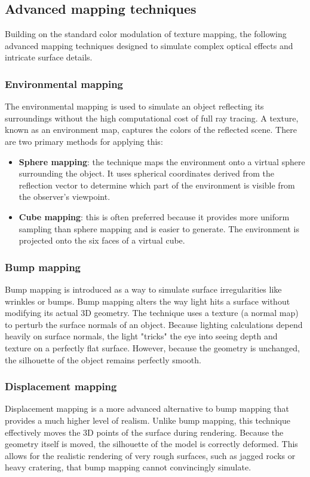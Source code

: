 \subsection{Advanced mapping techniques}
Building on the standard color modulation of texture mapping, the following advanced mapping techniques designed to simulate complex optical effects and intricate surface details. 

\subsubsection{Environmental mapping}
The environmental mapping is used to simulate an object reflecting its surroundings without the high computational cost of full ray tracing. A texture, known as an environment map, captures the colors of the reflected scene. There are two primary methods for applying this:
\begin{itemize}[noitemsep]
    \item \textbf{Sphere mapping}: the technique maps the environment onto a virtual sphere surrounding the object. It uses spherical coordinates derived from the reflection vector to determine which part of the environment is visible from the observer's viewpoint.
    \item \textbf{Cube mapping}: this is often preferred because it provides more uniform sampling than sphere mapping and is easier to generate. The environment is projected onto the six faces of a virtual cube. 
\end{itemize}

\subsubsection{Bump mapping}
Bump mapping is introduced as a way to simulate surface irregularities like wrinkles or bumps. Bump mapping alters the way light hits a surface without modifying its actual 3D geometry. The technique uses a texture (a normal map) to perturb the surface normals of an object. Because lighting calculations depend heavily on surface normals, the light "tricks" the eye into seeing depth and texture on a perfectly flat surface. However, because the geometry is unchanged, the silhouette of the object remains perfectly smooth.

\subsubsection{Displacement mapping}
Displacement mapping is a more advanced alternative to bump mapping that provides a much higher level of realism. Unlike bump mapping, this technique effectively moves the 3D points of the surface during rendering. Because the geometry itself is moved, the silhouette of the model is correctly deformed. This allows for the realistic rendering of very rough surfaces, such as jagged rocks or heavy cratering, that bump mapping cannot convincingly simulate. 

